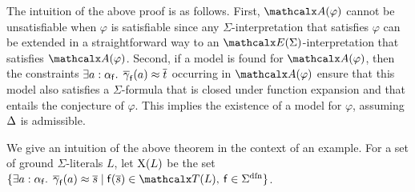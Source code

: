 \begin{rep}
The intuition of the above proof is as follows.
First, $\conv( \varphi )$ cannot be unsatisfiable when $\varphi$ is satisfiable
since any $\Sigma$-interpretation that satisfies $\varphi$ can be extended in a straightforward way to 
an $\extendsig{\Sigma}$-interpretation that satisfies $\conv( \varphi )$.
Second, if a model is found for $\conv( \varphi )$,
then the constraints $\exists a : \alpha_{\mathsf{f}}.\;\, \overline{\gamma}_{\mathsf{f}}( a ) \approx \overline{t}$
occurring in $\conv( \varphi )$ ensure that this model also satisfies
a $\Sigma$-formula that is closed under function expansion and
that entails the conjecture of $\varphi$.
This implies the existence of a model for $\varphi$,
assuming $\DDD$ is admissible.
\end{rep}

\begin{conf}
We give an intuition of the above theorem in the context of an example.
For a set of ground $\Sigma$-literals $L$, let $\mathrm{X}( L )$ be the set
$\{ \exists a : {\fargtype{\con{f}}}.\;\, \vecfarg{\con{f}}( a ) \teq \vec s
\mid \con{f}( \vec s ) \in \terms( L ),\: \con{f} \in \sfundefs{\Sigma}
\}$.
\end{conf}

